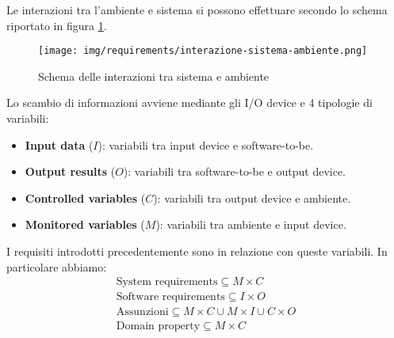 Le interazioni tra l'ambiente e sistema si possono effettuare secondo lo schema
riportato in figura \ref{fig:int-sistema-ambiente}.
\begin{figure}[!ht]
      \centering
      \texttt{[image: img/requirements/interazione-sistema-ambiente.png]}
      \caption{Schema delle interazioni tra sistema e ambiente}
      \label{fig:int-sistema-ambiente}
\end{figure}
Lo scambio di informazioni avviene mediante gli I/O device e 4 tipologie di variabili:
\begin{itemize}
      \item \textbf{Input data} ($I$): variabili tra input device e software-to-be.
      \item \textbf{Output results} ($O$): variabili tra software-to-be e output
            device.
      \item \textbf{Controlled variables} ($C$): variabili tra output device e
            ambiente.
      \item \textbf{Monitored variables} ($M$): variabili tra ambiente e input
            device.
\end{itemize}
I requisiti introdotti precedentemente sono in relazione con queste variabili.
In particolare abbiamo:
\begin{equation}
      \begin{array}{l}
            \text{System requirements} \subseteq M \times C                        \\
            \text{Software requirements} \subseteq I \times O                      \\
            \text{Assunzioni} \subseteq M \times C \cup M \times I \cup C \times O \\
            \text{Domain property}\subseteq M\times C
      \end{array}
\end{equation}
